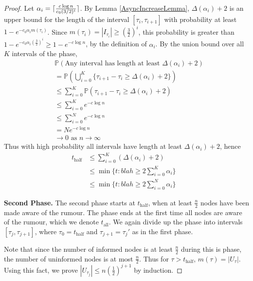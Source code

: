 \begin{proof}
	Let $\alpha_i = \lceil\frac{c \log n}{c_0 (3/2)^i}\rceil$. %
	By Lemma \ref{AsyncIncreaseLemma}, $\Delta(\alpha_i) + 2$ is an upper bound for the length of the interval $[\tau_i, \tau_{i+1}]$ 
	with probability at least $1 - e^{-c_0\alpha_i m(\tau_i)}$. %
	Since $m(\tau_i) = |I_{\tau_i}| \geq (\frac{3}{2})^i$, this probability is greater than $1 - e^{-c_0\alpha_i (\frac{3}{2})^i} \geq 1 - e^{-c \log n}$, by the definition of $\alpha_i$. By the union bound over all $K$ intervals of the phase,
	\begin{align*}
		& \mathbb{P}(\text{Any interval has length at least } \Delta(\alpha_i) + 2) \\
		&= \mathbb{P}(\bigcup_{i=0}^K \{\tau_{i+1} - \tau_i \geq \Delta(\alpha_i) + 2\}) \\
		&\leq \sum_{i=0}^K \mathbb{P}(\tau_{i+1} - \tau_i \geq \Delta(\alpha_i) + 2) \\
		&\leq \sum_{i=0}^K e^{-c \log n} \\
		&\leq \sum_{i=0}^N e^{-c \log n} 
		\\
		&= N e^{-c \log n} \\
		&\to 0 \text { as } n \to \infty
	\end{align*}
	Thus with high probability all intervals have length at least $\Delta(\alpha_i) + 2$, hence
	\begin{align*}
		t_\text{half} &\leq \sum_{i=0}^K (\Delta(\alpha_i) + 2) \\
		&\leq \min \{t : blah \geq 2 \sum_{i=0}^K \alpha_i \} \\ %
		&\leq \min \{t : blah \geq 2 \sum_{i=0}^N \alpha_i \} & %
	\end{align*}

	\textbf{Second Phase.} The second phase starts at $t_\text{half}$, when at least $\frac{n}{2}$ nodes have been made aware of the rumour. The phase ends at the first time all nodes are aware of the rumour, which we denote $t_\text{all}$. We again divide up the phase into intervals $[\tau_j, \tau_{j+1}]$, where $\tau_0 = t_\text{half}$ and $\tau_{j+1} = \tau_j'$ as in the first phase.

	Note that since the number of informed nodes is at least $\frac{n}{2}$ during this is phase, the number of uninformed nodes is at most $\frac{n}{2}$. Thus for $\tau > t_\text{half}$, $m(\tau) = |U_\tau|$. Using this fact, we prove $|U_{\tau_j}| \leq n(\frac{1}{2})^{j+1}$ by induction.


\end{proof}
